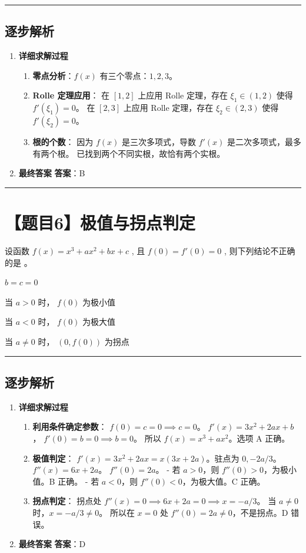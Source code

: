 \documentclass[UTF8]{ctexart}
\newenvironment{redenv}{\color{red}}{}
\newenvironment{detailedanalysis}{%
    \color{red}
    \begin{enumerate}[label=\textbf{第\arabic*步：}, leftmargin=*, align=left, itemsep=1.5ex]
}{%
    \end{enumerate}
}
\newcommand{\problemrule}{\noindent\rule{\textwidth}{1.5pt}\vspace{-0.8em}}
\newcommand{\analysisrule}{\noindent\rule{\textwidth}{0.8pt}\vspace{-0.8em}}
\newcommand{\choicesTwo}[4]{
    \begin{enumerate}[label=\Alph*., itemsep=0pt, parsep=0pt, topsep=5pt, labelsep=0.5em]
        \begin{minipage}{0.45\linewidth} \item #1 \end{minipage}
        \begin{minipage}{0.45\linewidth} \item #2 \end{minipage}
        \begin{minipage}{0.45\linewidth} \item #3 \end{minipage}
        \begin{minipage}{0.45\linewidth} \item #4 \end{minipage}
    \end{enumerate}
}
\newcommand{\blank}[1]{\underline{\hspace{#1}}}
\begin{document}
\begin{redenv}
\analysisrule
\subsection*{逐步解析}

\begin{detailedanalysis}
\item \textbf{详细求解过程}
\begin{enumerate}[label=(\arabic*)]
\item \textbf{零点分析}：$f(x)$ 有三个零点：$1, 2, 3$。
\item \textbf{Rolle 定理应用}：
在 $[1, 2]$ 上应用 Rolle 定理，存在 $\xi_1 \in (1, 2)$ 使得 $f'(\xi_1) = 0$。
在 $[2, 3]$ 上应用 Rolle 定理，存在 $\xi_2 \in (2, 3)$ 使得 $f'(\xi_2) = 0$。
\item \textbf{根的个数}：
因为 $f(x)$ 是三次多项式，导数 $f'(x)$ 是二次多项式，最多有两个根。
已找到两个不同实根，故恰有两个实根。
\end{enumerate}

\item \textbf{最终答案}
\textbf{答案}：B
\end{detailedanalysis}
\end{redenv}

\problemrule
\section*{【题目6】极值与拐点判定}
设函数 $ f(x) = x^{3} + ax^{2} + bx + c $ , 且 $ f(0) = f'(0) = 0 $ , 则下列结论不正确的是 \blank{1cm}。
\choicesTwo
{$ b = c = 0 $}
{当 $a > 0$ 时， $ f(0) $ 为极小值}
{当 $a < 0$ 时， $ f(0) $ 为极大值}
{当 $ a \neq 0 $ 时， $ (0, f(0)) $ 为拐点}

\begin{redenv}
\analysisrule
\subsection*{逐步解析}

\begin{detailedanalysis}
\item \textbf{详细求解过程}
\begin{enumerate}[label=(\arabic*)]
\item \textbf{利用条件确定参数}：
$f(0) = c = 0 \implies c=0$。
$f'(x) = 3x^2 + 2ax + b$，
$f'(0) = b = 0 \implies b=0$。
所以 $f(x) = x^3 + ax^2$。选项 A 正确。
\item \textbf{极值判定}：
$f'(x) = 3x^2 + 2ax = x(3x + 2a)$。驻点为 $0, -2a/3$。
$f''(x) = 6x + 2a$。
$f''(0) = 2a$。
- 若 $a > 0$，则 $f''(0) > 0$，为极小值。B 正确。
- 若 $a < 0$，则 $f''(0) < 0$，为极大值。C 正确。
\item \textbf{拐点判定}：
拐点处 $f''(x) = 0 \implies 6x + 2a = 0 \implies x = -a/3$。
当 $a \neq 0$ 时，$x = -a/3 \neq 0$。
所以在 $x=0$ 处 $f''(0) = 2a \neq 0$，不是拐点。D 错误。
\end{enumerate}

\item \textbf{最终答案}
\textbf{答案}：D
\end{detailedanalysis}
\end{redenv}
\end{document}
